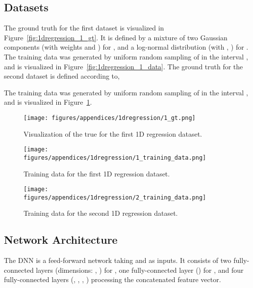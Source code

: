 \documentclass{bmvc2k}
\begin{document}
\begin{appendices}
\subsection{Datasets}
The ground truth  for the first dataset is visualized in Figure~\ref{fig:1dregression_1_gt}. It is defined by a mixture of two Gaussian components (with weights  and ) for , and a log-normal distribution (with , ) for . The training data  was generated by uniform random sampling of  in the interval , and is visualized in Figure~\ref{fig:1dregression_1_data}. The ground truth  for the second dataset is defined according to,

The training data  was generated by uniform random sampling of  in the interval , and is visualized in Figure~\ref{fig:1dregression_2_data}.

\begin{figure}[t]\begin{minipage}{0.3125\textwidth}\centering
        \texttt{[image: figures/appendices/1dregression/1\_gt.png]}\vspace{-7.0mm}
        \caption{Visualization of the true  for the first 1D regression dataset.}\vspace{-3mm}
        \label{fig:1dregression_1_gt}\end{minipage}
    \quad
    \begin{minipage}{0.3125\textwidth}\centering
        \texttt{[image: figures/appendices/1dregression/1\_training\_data.png]}\vspace{-7.0mm}
        \caption{Training data  for the first 1D regression dataset.}\vspace{-3mm}
        \label{fig:1dregression_1_data}\end{minipage}\quad
    \begin{minipage}{0.3125\textwidth}\centering
        \texttt{[image: figures/appendices/1dregression/2\_training\_data.png]}\vspace{-7.0mm}
        \caption{Training data  for the second 1D regression dataset.}\vspace{-3mm}
        \label{fig:1dregression_2_data}\end{minipage}\end{figure}








\subsection{Network Architecture}
The DNN  is a feed-forward network taking  and  as inputs. It consists of two fully-connected layers (dimensions: , ) for , one fully-connected layer () for , and four fully-connected layers (, , , ) processing the concatenated  feature vector.













\end{appendices}
\end{document}
